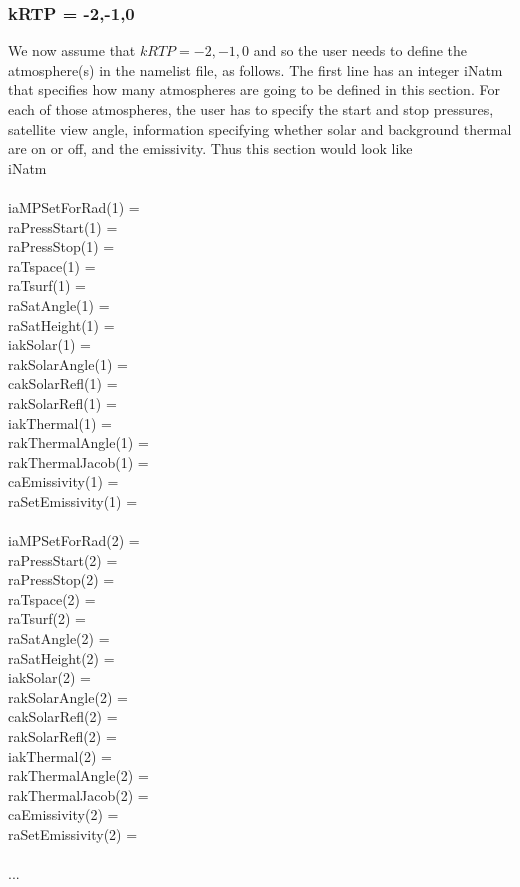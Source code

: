 \documentclass[12pt]{article}
\newcommand{\ttab}{\indent\indent}
\begin{document}
{\subsubsection{kRTP = -2,-1,0}
\noindent We now assume that $kRTP = -2,-1,0$ and so the user needs to define 
the atmosphere(s) in the namelist file, as follows. The first line has an 
integer {\sf iNatm} that specifies how many atmospheres are going 
to be defined in this section. For each of those atmospheres, the user
has to specify the start and stop pressures, satellite view angle, 
information specifying whether solar and background  thermal are on or off, 
and the emissivity. Thus this section would look like\\
{\sf
\ttab iNatm\\ 
\ttab \\
\ttab iaMPSetForRad(1)   = \\
\ttab raPressStart(1)    = \\
\ttab raPressStop(1)     = \\
\ttab raTspace(1)        = \\
\ttab raTsurf(1)         = \\
\ttab raSatAngle(1)      = \\
\ttab raSatHeight(1)     = \\
\ttab iakSolar(1)        = \\
\ttab rakSolarAngle(1)   = \\
\ttab cakSolarRefl(1)    = \\
\ttab rakSolarRefl(1)    = \\
\ttab iakThermal(1)      = \\
\ttab rakThermalAngle(1) = \\
\ttab rakThermalJacob(1) = \\
\ttab caEmissivity(1)    = \\
\ttab raSetEmissivity(1) = \\
\ttab \\
\ttab iaMPSetForRad(2)   = \\
\ttab raPressStart(2)    = \\
\ttab raPressStop(2)     = \\
\ttab raTspace(2)        = \\
\ttab raTsurf(2)         = \\
\ttab raSatAngle(2)      = \\
\ttab raSatHeight(2)     = \\
\ttab iakSolar(2)        = \\
\ttab rakSolarAngle(2)   = \\
\ttab cakSolarRefl(2)    = \\
\ttab rakSolarRefl(2)    = \\
\ttab iakThermal(2)      = \\
\ttab rakThermalAngle(2) = \\
\ttab rakThermalJacob(2) = \\
\ttab caEmissivity(2)    = \\
\ttab raSetEmissivity(2) = \\
\ttab \\
\ttab ...\\
}

}
\end{document}
